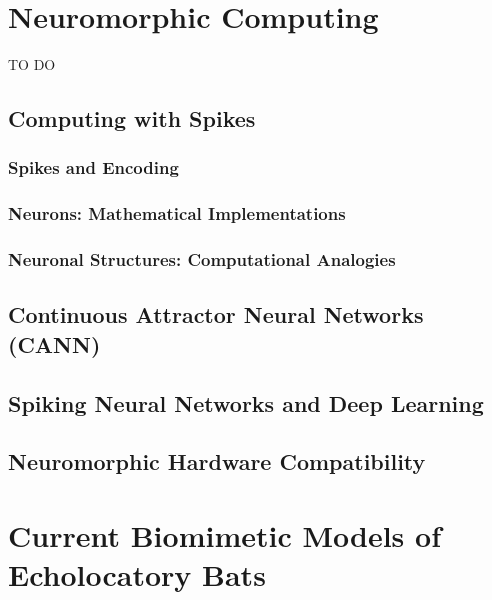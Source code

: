 \section{Neuromorphic Computing}
TO DO

\subsection{Computing with Spikes}

\subsubsection{Spikes and Encoding}


\subsubsection{Neurons: Mathematical Implementations}


\subsubsection{Neuronal Structures: Computational Analogies}


\subsection{Continuous Attractor Neural Networks (CANN)}


\subsection{Spiking Neural Networks and Deep Learning}


\subsection{Neuromorphic Hardware Compatibility}


\section{Current Biomimetic Models of Echolocatory Bats}














